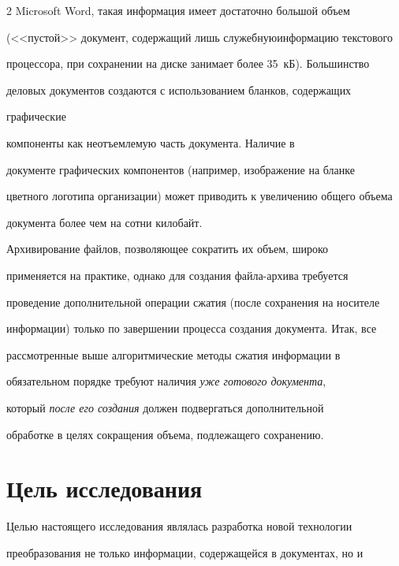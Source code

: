\begin{multicols}{2}
Microsoft Word, такая информация имеет достаточно большой объем 


(<<пустой>> документ, содержащий лишь служебную\linebreak информацию текстового 


процессора, при сохранении на диске занимает более 35~кБ). Большинство 


деловых документов создаются с использованием бланков, содержащих 


графические\linebreak


компоненты как неотъемлемую часть документа. Наличие в 


документе графических компонентов (например, изображение на бланке 


цветного логотипа организации) может приводить к увеличению общего объема 


документа более чем на сотни килобайт.


     


     Архивирование файлов, позволяющее сократить их объем, широко 


применяется на практике, однако для создания файла-архива требуется 


проведение дополнительной операции сжатия (после сохранения на носителе 


информации) только по завершении процесса создания документа. Итак, все 


рассмотренные выше алгоритмические методы сжатия информации в 


обязательном порядке требуют наличия \textit{уже готового документа}, 


который \textit{после его создания} должен подвергаться дополнительной 


обработке в целях сокращения объема, подлежащего сохранению.





\section{Цель исследования}


     


     Целью настоящего исследования являлась разработка новой технологии 


преобразования не только информации, содержащейся в документах, но и 



\end{multicols}
